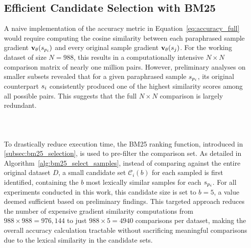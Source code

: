 \subsection{Efficient Candidate Selection with BM25}\label{subsec:setup_bm25}
A naive implementation of the accuracy metric in Equation~\ref{eq:accuracy_full} would require computing the cosine similarity between each paraphrased sample gradient $\mathbf{v}_{\theta}(s_{p_i})$ and every original sample gradient $\mathbf{v}_{\theta}(s_j)$. For the working dataset of size $N=988$, this results in a computationally intensive $N \times N$ comparison matrix of nearly one million pairs. However, preliminary analyses on smaller subsets revealed that for a given paraphrased sample $s_{p_i}$, its original counterpart $s_i$ consistently produced one of the highest similarity scores among all possible pairs. This suggests that the full $N \times N$ comparison is largely redundant.
\\\\\\\\
To drastically reduce execution time, the BM25 ranking function, introduced in \autoref{subsec:bm25_selection}, is used to pre-filter the comparison set. As detailed in Algorithm~\ref{alg:bm25_select_samples}, instead of comparing against the entire original dataset $D$, a small candidate set $\mathcal{C}_i(b)$ for each sampled is first identified, containing the $b$ most lexically similar samples for each $s_{p_i}$. For all experiments conducted in this work, this candidate size is set to $b=5$, a value deemed sufficient based on preliminary findings. This targeted approach reduces the number of expensive gradient similarity computations from $988 \times 988 = 976{,}144$ to just $988 \times 5 = 4940$ comparisons per dataset, making the overall accuracy calculation tractable without sacrificing meaningful comparisons due to the lexical similarity in the candidate sets.

